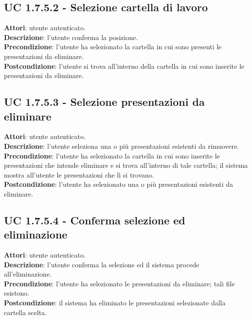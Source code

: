 		\subsection{UC 1.7.5.2 - Selezione cartella di lavoro}{
			\label{uc1.7.5.2}
			\textbf{Attori}: utente autenticato. \\
			\textbf{Descrizione}: l'utente conferma la posizione. \\
			\textbf{Precondizione}: l'utente ha selezionato la cartella in cui sono presenti le presentazioni da eliminare.	\\
			\textbf{Postcondizione}: l'utente si trova all'interno della cartella in cui sono inserite le presentazioni da eliminare. 	\\
			}
		\subsection{UC 1.7.5.3 - Selezione presentazioni da eliminare}{
			\label{uc1.7.5.3}
			\textbf{Attori}: utente autenticato. \\
			\textbf{Descrizione}: l'utente seleziona una o più presentazioni esistenti da rimuovere. \\
			\textbf{Precondizione}: l'utente ha selezionato la cartella in cui sono  inserite le presentazioni che intende eliminare e si trova all'interno di tale cartella; il sistema mostra all'utente le presentazioni che lì si trovano.	\\
			\textbf{Postcondizione}: l'utente ha selezionato una o più presentazioni esistenti da eliminare.	\\
			}
		\subsection{UC 1.7.5.4 - Conferma selezione ed eliminazione}{
			\label{uc1.7.5.4}
			\textbf{Attori}: utente autenticato. \\
			\textbf{Descrizione}: l'utente conferma la selezione ed il sistema procede all'eliminazione. \\
			\textbf{Precondizione}: l'utente ha selezionato le presentazioni da eliminare; tali file esistono.	\\
			\textbf{Postcondizione}: il sistema ha eliminato le presentazioni selezionate dalla cartella scelta.	\\
			}